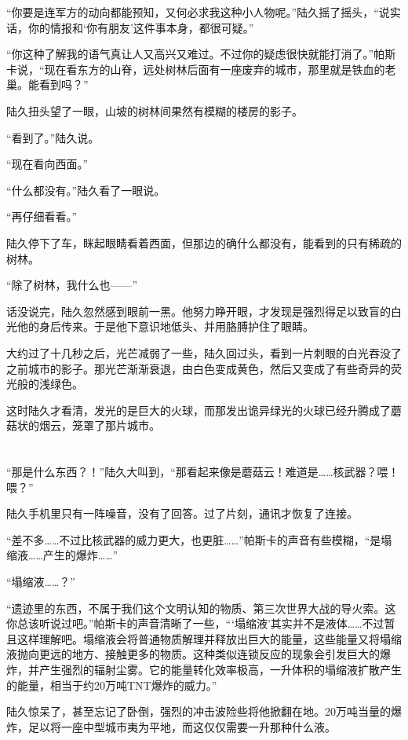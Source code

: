 “你要是连军方的动向都能预知，又何必求我这种小人物呢。”陆久摇了摇头，“说实话，你的情报和‘你有朋友’这件事本身，都很可疑。”

“你这种了解我的语气真让人又高兴又难过。不过你的疑虑很快就能打消了。”帕斯卡说，“现在看东方的山脊，远处树林后面有一座废弃的城市，那里就是铁血的老巢。能看到吗？”

陆久扭头望了一眼，山坡的树林间果然有模糊的楼房的影子。

“看到了。”陆久说。

“现在看向西面。”

“什么都没有。”陆久看了一眼说。

“再仔细看看。”

陆久停下了车，眯起眼睛看着西面，但那边的确什么都没有，能看到的只有稀疏的树林。

“除了树林，我什么也——”

话没说完，陆久忽然感到眼前一黑。他努力睁开眼，才发现是强烈得足以致盲的白光他的身后传来。于是他下意识地低头、并用胳膊护住了眼睛。

大约过了十几秒之后，光芒减弱了一些，陆久回过头，看到一片刺眼的白光吞没了之前城市的影子。那光芒渐渐衰退，由白色变成黄色，然后又变成了有些奇异的荧光般的浅绿色。

这时陆久才看清，发光的是巨大的火球，而那发出诡异绿光的火球已经升腾成了蘑菇状的烟云，笼罩了那片城市。

\section*{}

“那是什么东西？！”陆久大叫到，“那看起来像是蘑菇云！难道是……核武器？喂！喂？”

陆久手机里只有一阵噪音，没有了回答。过了片刻，通讯才恢复了连接。

“差不多……不过比核武器的威力更大，也更脏……”帕斯卡的声音有些模糊，“是塌缩液……产生的爆炸……”

“塌缩液……？”

“遗迹里的东西，不属于我们这个文明认知的物质、第三次世界大战的导火索。这你总该听说过吧。”帕斯卡的声音清晰了一些，“‘塌缩液’其实并不是液体……不过暂且这样理解吧。塌缩液会将普通物质解理并释放出巨大的能量，这些能量又将塌缩液抛向更远的地方、接触更多的物质。这种类似连锁反应的现象会引发巨大的爆炸，并产生强烈的辐射尘雾。它的能量转化效率极高，一升体积的塌缩液扩散产生的能量，相当于约20万吨TNT爆炸的威力。”

陆久惊呆了，甚至忘记了卧倒，强烈的冲击波险些将他掀翻在地。20万吨当量的爆炸，足以将一座中型城市夷为平地，而这仅仅需要一升那种什么液。

